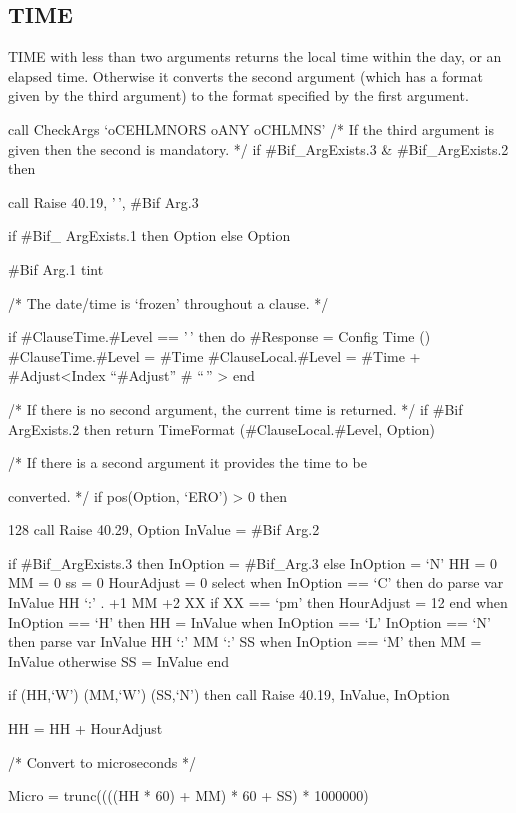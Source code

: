 \hypertarget{time-1}{%
\subsection{TIME}\label{time-1}}

TIME with less than two arguments returns the local time within the day,
or an elapsed time. Otherwise it converts the second argument (which has
a format given by the third argument) to the format specified by the
first argument.

call CheckArgs `oCEHLMNORS oANY oCHLMNS' /* If the third argument is
given then the second is mandatory. */ if \#Bif\_ArgExists.3 \&
\#Bif\_ArgExists.2 then

call Raise 40.19, '\,', \#Bif Arg.3

if \#Bif\_ ArgExists.1 then Option else Option

\#Bif Arg.1 tint

/* The date/time is `frozen' throughout a clause. */

if \#ClauseTime.\#Level == '\,' then do \#Response = Config Time ()
\#ClauseTime.\#Level = \#Time \#ClauseLocal.\#Level = \#Time +
\#Adjust\textless Index ``\#Adjust'' \# ``\,'' \textgreater{} end

/* If there is no second argument, the current time is returned. */ if
\#Bif ArgExists.2 then return TimeFormat (\#ClauseLocal.\#Level, Option)

/* If there is a second argument it provides the time to be

converted. */ if pos(Option, `ERO') \textgreater{} 0 then

128 call Raise 40.29, Option InValue = \#Bif Arg.2

if \#Bif\_ArgExists.3 then InOption = \#Bif\_Arg.3 else InOption = `N'
HH = 0 MM = 0 ss = 0 HourAdjust = 0 select when InOption == `C' then do
parse var InValue HH `:' . +1 MM +2 XX if XX == `pm' then HourAdjust =
12 end when InOption == `H' then HH = InValue when InOption == `L'
\textbar{} InOption == `N' then parse var InValue HH `:' MM `:' SS when
InOption == `M' then MM = InValue otherwise SS = InValue end

if \datatype(HH,`W') \textbar{} \datatype(MM,`W') \textbar{}
\datatype(SS,`N') then call Raise 40.19, InValue, InOption

HH = HH + HourAdjust

/* Convert to microseconds */

Micro = trunc((((HH * 60) + MM) * 60 + SS) * 1000000)


